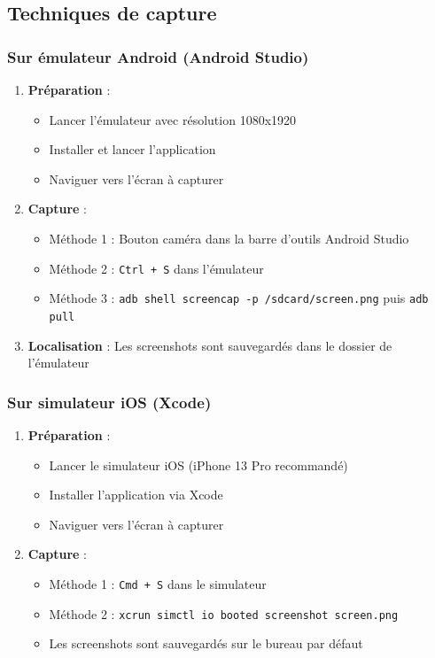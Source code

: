 \documentclass[a4paper,11pt]{report}
\begin{document}
\subsection{Techniques de capture}

\subsubsection{Sur émulateur Android (Android Studio)}

\begin{enumerate}
    \item \textbf{Préparation} :
    \begin{itemize}
        \item Lancer l'émulateur avec résolution 1080x1920
        \item Installer et lancer l'application
        \item Naviguer vers l'écran à capturer
    \end{itemize}
    
    \item \textbf{Capture} :
    \begin{itemize}
        \item Méthode 1 : Bouton caméra dans la barre d'outils Android Studio
        \item Méthode 2 : \texttt{Ctrl + S} dans l'émulateur
        \item Méthode 3 : \texttt{adb shell screencap -p /sdcard/screen.png} puis \texttt{adb pull}
    \end{itemize}
    
    \item \textbf{Localisation} : Les screenshots sont sauvegardés dans le dossier de l'émulateur
\end{enumerate}

\subsubsection{Sur simulateur iOS (Xcode)}

\begin{enumerate}
    \item \textbf{Préparation} :
    \begin{itemize}
        \item Lancer le simulateur iOS (iPhone 13 Pro recommandé)
        \item Installer l'application via Xcode
        \item Naviguer vers l'écran à capturer
    \end{itemize}
    
    \item \textbf{Capture} :
    \begin{itemize}
        \item Méthode 1 : \texttt{Cmd + S} dans le simulateur
        \item Méthode 2 : \texttt{xcrun simctl io booted screenshot screen.png}
        \item Les screenshots sont sauvegardés sur le bureau par défaut
    \end{itemize}
\end{enumerate}
\end{document}
